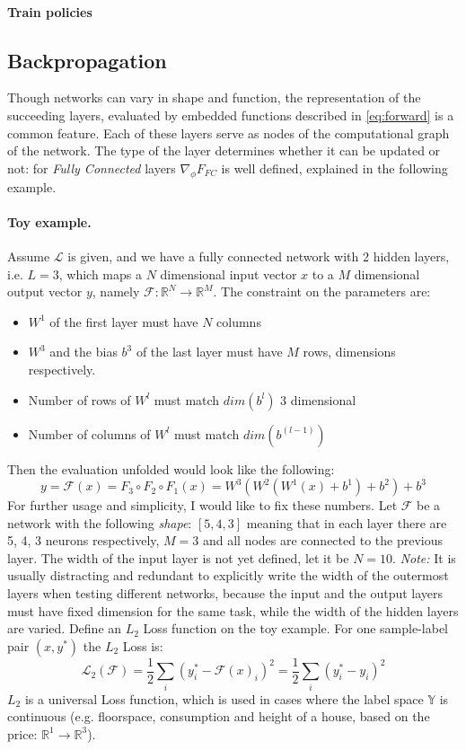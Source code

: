 \paragraph{Train policies} 

\subsection{Backpropagation} 
Though networks can vary in shape and function, the representation of the succeeding layers, evaluated by embedded functions described in \ref{eq:forward} is a common feature. Each of these layers serve as nodes of the computational graph of the network. The type of the layer determines whether it can be updated or not: for \emph{Fully Connected} layers $\nabla_\phi F_{FC}$ is well defined, explained in the following example.

\paragraph{Toy example.} 
Assume $\mathcal{L}$ is given, and we have a fully connected network with 2 hidden layers, i.e. $L=3$, which maps a $N$ dimensional input vector $x$ to a $M$ dimensional output vector $y$, namely $\mathcal{F}:\mathbb{R}^N \rightarrow \mathbb{R}^M$. The constraint on the parameters are:
\begin{itemize}
    \item[] $W^1$ of the first layer must have $N$ columns
    \item[] $W^3$ and the bias $b^3$ of the last layer must have $M$ rows, dimensions respectively.
    \item[] Number of rows of $W^l$ must match $dim(b^l)$ $3$ dimensional
    \item[] Number of columns of $W^l$ must match $dim(b^{(l-1)})$
\end{itemize} 
Then the evaluation unfolded would look like the following: 
$$y = \mathcal{F}(x) = F_3 \circ F_2 \circ F_1(x) = W^3(W^2(W^1(x)+b^1)+b^2)+b^3$$
For further usage and simplicity, I would like to fix these numbers.
Let $\mathcal{F}$ be a network with the following \emph{shape}: $\left[5, 4, 3\right] $
meaning that in each layer there are 5, 4, 3 neurons respectively, $M=3$ and all nodes are connected to the previous layer. The width of the input layer is not yet defined, let it be $N=10$. 
\emph{Note:} It is usually distracting and redundant to explicitly write the width of the outermost layers when testing different networks, because the input and the output layers must have fixed dimension for the same task, while the width of the hidden layers are varied.
Define an $L_2$ Loss function on the toy example. For one sample-label pair $(x,y^*)$ the $L_2$ Loss is:
\begin{equation}
    \mathcal{L}_2(\mathcal{F}) = \frac{1}{2} \sum_{i} (y_i^* - \mathcal{F}(x)_i)^2 = \frac{1}{2} \sum_{i} (y_i^* - y_i)^2
\end{equation}
$L_2$ is a universal Loss function, which is used in cases where the label space $\mathbb{Y}$ is continuous (e.g. floorspace, consumption and height of a house, based on the price: $\mathbb{R}^1 \rightarrow \mathbb{R}^3$).

